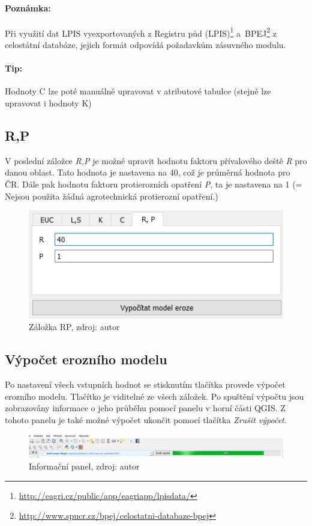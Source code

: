 \paragraph{Poznámka:} Při využití dat LPIS vyexportovaných z Registru
půd
(LPIS)\footnote{\url{http://eagri.cz/public/app/eagriapp/lpisdata/}}
a~BPEJ\footnote{\url{http://www.spucr.cz/bpej/celostatni-databaze-bpej}}
z celostátní databáze, jejich formát odpovídá požadavkům zásuvného
modulu.
\paragraph{Tip:} Hodnoty C lze poté manuálně upravovat v atributové
tabulce (stejně lze upravovat i hodnoty K)
\subsection{R,P} V poslední záložce \textit{R,P} je možné upravit
hodnotu faktoru přívalového deště \textit{R} pro danou oblast. Tato
hodnota je nastavena na 40, což je průměrná hodnota pro ČR. Dále pak
hodnotu faktoru protierozních opatření \textit{P}, ta je nastavena na
1 (= Nejsou použita žádná agrotechnická protierozní opatření.)
\begin{figure}[H] \centering
		\includegraphics[width=.55\textwidth]{./pictures/rp.png}
		\caption[Záložka RP]{Záložka RP, zdroj: autor}
		\label{zalozka_rp}
\end{figure}
\subsection{Výpočet erozního modelu} Po nastavení všech vstupních
hodnot se stisknutím tlačítka provede výpočet erozního
modelu. Tlačítko je viditelné ze všech záložek. Po spuštění výpočtu
jsou zobrazovány informace o jeho průběhu pomocí panelu v horní části
QGIS. Z tohoto panelu je také možné výpočet ukončit pomocí tlačítka
\textit{Zrušit výpočet}.
\begin{figure}[H] \centering
		\includegraphics[width=.9\textwidth]{./pictures/progressbar.png}
		\caption[Informačního panel]{Informační panel,
zdroj: autor}
		\label{informacni_panel}
\end{figure}
